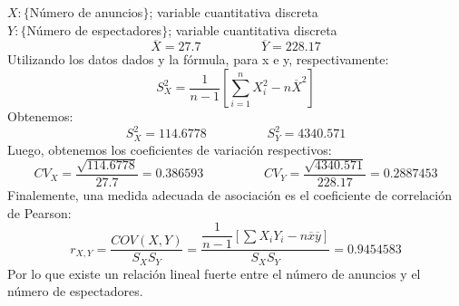 \begin{solution}
$X:\{$Número de anuncios$\}$; variable cuantitativa discreta\\$Y:\{$Número de espectadores$\}$; variable cuantitativa discreta\\
$$\overline{X}=27.7 \hspace{2cm} \overline{Y}=228.17$$
Utilizando los datos dados y la fórmula, para x e y, respectivamente:
$$S_{X}^{2}=\dfrac{1}{n-1}\left[ \sum_{i=1}^{n} X_{i}^{2}- n\overline{X}^2\right]$$
Obtenemos:$$S_{X}^{2}=114.6778 \hspace{2cm} S_{Y}^{2}=4340.571$$
Luego, obtenemos los coeficientes de variación respectivos:
$$CV_{X}=\dfrac{\sqrt{114.6778}}{27.7}=0.386593\hspace{2cm}CV_{Y}=\dfrac{\sqrt{4340.571}}{228.17}=0.2887453$$
Finalemente, una medida adecuada de asociación es el coeficiente de correlación de Pearson:
$$r_{X,Y}=\dfrac{COV(X,Y)}{S_X S_Y}=\dfrac{\dfrac{1}{n-1}\left[ \sum X_i Y_i -n \overline{x}\overline{y}\right]}{S_X S_Y}=0.9454583$$
Por lo que existe un relación lineal fuerte entre el número de anuncios y el número de espectadores.
\end{solution}
